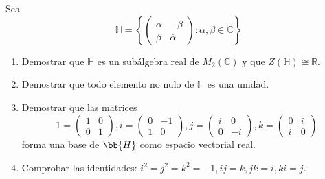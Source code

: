 \begin{ejercicio}
    Sea 
    \begin{equation*}
        \mathbb{H} = \left\{\left(\begin{array}{cc}
            \alpha & -\overline{\beta} \\
            \beta & \overline{\alpha } 
        \end{array}\right) : \alpha, \beta \in \mathbb{C}\right\}
    \end{equation*}
    \begin{enumerate}
        \item Demostrar que $\mathbb{H}$ es un subálgebra real de $M_2(\mathbb{C})$ y que $Z(\mathbb{H}) \cong \mathbb{R}$.
        \item Demostrar que todo elemento no nulo de $\mathbb{H}$ es una unidad.
        \item Demostrar que las matrices 
            \begin{equation*}
                1 = \left(\begin{array}{cc}
                    1 & 0 \\
                    0 & 1 
                \end{array}\right), 
                i = \left(\begin{array}{cc}
                    0 & -1 \\
                    1 & 0 
                \end{array}\right), 
                j = \left(\begin{array}{cc}
                    i & 0 \\
                    0 & -i  
                \end{array}\right),
                k = \left(\begin{array}{cc}
                    0 & i \\
                    i & 0 
                \end{array}\right)
            \end{equation*}
            forma una base de $\bb{H}$ como espacio vectorial real.
            \item Comprobar las identidades: $i^2 = j^2 = k^2 = -1, ij=k, jk=i, ki=j$.
    \end{enumerate} 
    

\end{ejercicio}

